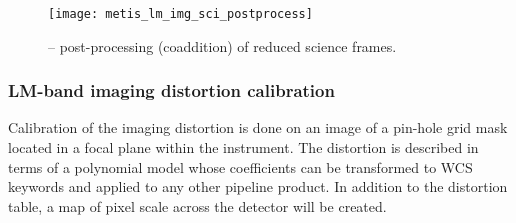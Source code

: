 \begin{figure}[hb]
  \centering
  \texttt{[image: metis\_lm\_img\_sci\_postprocess]}
  \caption[Recipe: ]{%
    \hyperref[rec:metis_lm_img_sci_postprocess]{} -- post-processing (coaddition)
    of reduced  science frames.}
  \label{fig:metis_lm_img_sci_postprocess}
\end{figure}

\clearpage
\subsubsection{LM-band imaging distortion calibration}
\label{rec:metis_lm_img_distortion}
\label{lm_img_distortion}
\label{rec:lm_img_distortion}
\label{sssec:lm_img_distortion}

Calibration of the imaging distortion is done on an image of a
pin-hole grid mask located in a focal plane within the instrument. The
distortion is described in terms of a polynomial model whose
coefficients can be transformed to WCS keywords and applied to any
other pipeline product. In addition to the distortion table, a map of
pixel scale across the detector will be created.

